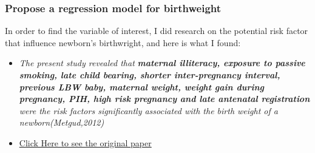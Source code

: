 \documentclass[]{article}
\newenvironment{Shaded}{\begin{snugshade}}{\end{snugshade}}
\newcommand{\DataTypeTok}[1]{\textcolor[rgb]{0.13,0.29,0.53}{#1}}
\newcommand{\DecValTok}[1]{\textcolor[rgb]{0.00,0.00,0.81}{#1}}
\newcommand{\KeywordTok}[1]{\textcolor[rgb]{0.13,0.29,0.53}{\textbf{#1}}}
\newcommand{\NormalTok}[1]{#1}
\newcommand{\OperatorTok}[1]{\textcolor[rgb]{0.81,0.36,0.00}{\textbf{#1}}}
\newcommand{\StringTok}[1]{\textcolor[rgb]{0.31,0.60,0.02}{#1}}
\providecommand{\tightlist}{%
  \setlength{\itemsep}{0pt}\setlength{\parskip}{0pt}}
\begin{document}
\begin{Shaded}
\end{Shaded}

\hypertarget{propose-a-regression-model-for-birthweight}{%
\subsubsection{Propose a regression model for
birthweight}\label{propose-a-regression-model-for-birthweight}}

In order to find the variable of interest, I did research on the
potential risk factor that influence newborn's birthwright, and here is
what I found:

\begin{itemize}
\tightlist
\item
  \emph{The present study revealed that} \textbf{\emph{maternal
  illiteracy, exposure to passive smoking, late child bearing, shorter
  inter-pregnancy interval, previous LBW baby, maternal weight, weight
  gain during pregnancy, PIH, high risk pregnancy and late antenatal
  registration}} \emph{were the risk factors significantly associated
  with the birth weight of a newborn(Metgud,2012)}
\item
  \href{https://www.ncbi.nlm.nih.gov/pmc/articles/PMC3390317/\#}{Click
  Here to see the original paper}
\end{itemize}
\end{document}
